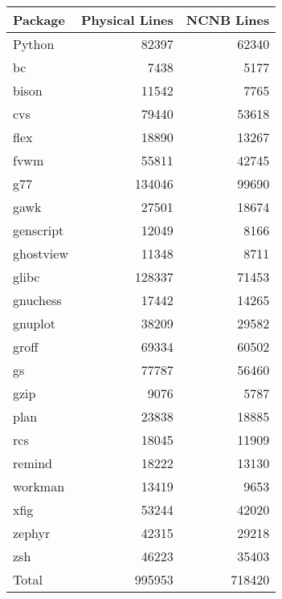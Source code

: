 \begin{tabular}{|l|r|r|}\hline
Package & Physical Lines & NCNB Lines\\\hline\hline
Python & 82397 & 62340 \\\hline
bc & 7438 & 5177 \\\hline
bison & 11542 & 7765 \\\hline
cvs & 79440 & 53618 \\\hline
flex & 18890 & 13267 \\\hline
fvwm & 55811 & 42745 \\\hline
g77 & 134046 & 99690 \\\hline
gawk & 27501 & 18674 \\\hline
genscript & 12049 & 8166 \\\hline
ghostview & 11348 & 8711 \\\hline
glibc & 128337 & 71453 \\\hline
gnuchess & 17442 & 14265 \\\hline
gnuplot & 38209 & 29582 \\\hline
groff & 69334 & 60502 \\\hline
gs & 77787 & 56460 \\\hline
gzip & 9076 & 5787 \\\hline
plan & 23838 & 18885 \\\hline
rcs & 18045 & 11909 \\\hline
remind & 18222 & 13130 \\\hline
workman & 13419 & 9653 \\\hline
xfig & 53244 & 42020 \\\hline
zephyr & 42315 & 29218 \\\hline
zsh & 46223 & 35403 \\\hline\hline
Total & 995953 & 718420 \\\hline
\end{tabular}
